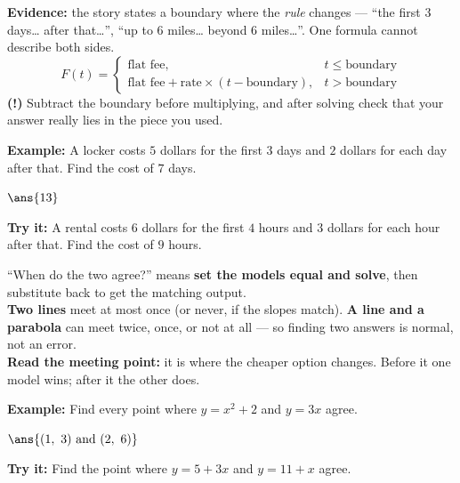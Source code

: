 \documentclass[12pt]{article}
\begin{document}
\begin{formulabox}
\textbf{Evidence:} the story states a boundary where the \emph{rule} changes
--- ``the first 3 days\ldots{} after that\ldots'', ``up to 6 miles\ldots{}
beyond 6 miles\ldots''. One formula cannot describe both sides.
\[ F(t) = \begin{cases} \text{flat fee}, & t \le \text{boundary} \\
   \text{flat fee} + \text{rate} \times (t - \text{boundary}), &
   t > \text{boundary} \end{cases} \]
\textbf{(!)} Subtract the boundary before multiplying, and after solving check
that your answer really lies in the piece you used.
\end{formulabox}
\begin{examplebox}
\textbf{Example:} A locker costs $5$ dollars for the first $3$ days and $2$
dollars for each day after that. Find the cost of $7$ days.
\par
$\ans{13}$
\end{examplebox}
\begin{tryitbox}
\textbf{Try it:} A rental costs $6$ dollars for the first $4$ hours and $3$
dollars for each hour after that. Find the cost of $9$ hours.\\[2pt]
\end{tryitbox}

\begin{formulabox}
``When do the two agree?'' means \textbf{set the models equal and solve}, then
substitute back to get the matching output.\\[3pt]
\textbf{Two lines} meet at most once (or never, if the slopes match).
\textbf{A line and a parabola} can meet twice, once, or not at all --- so
finding two answers is normal, not an error.\\[3pt]
\textbf{Read the meeting point:} it is where the cheaper option changes. Before
it one model wins; after it the other does.
\end{formulabox}
\begin{examplebox}
\textbf{Example:} Find every point where $y = x^2 + 2$ and $y = 3x$ agree.
\par
$\ans{(1,\ 3) \text{ and } (2,\ 6)}$
\end{examplebox}
\begin{tryitbox}
\textbf{Try it:} Find the point where $y = 5 + 3x$ and $y = 11 + x$
agree.\\[2pt]
\end{tryitbox}
\end{document}
